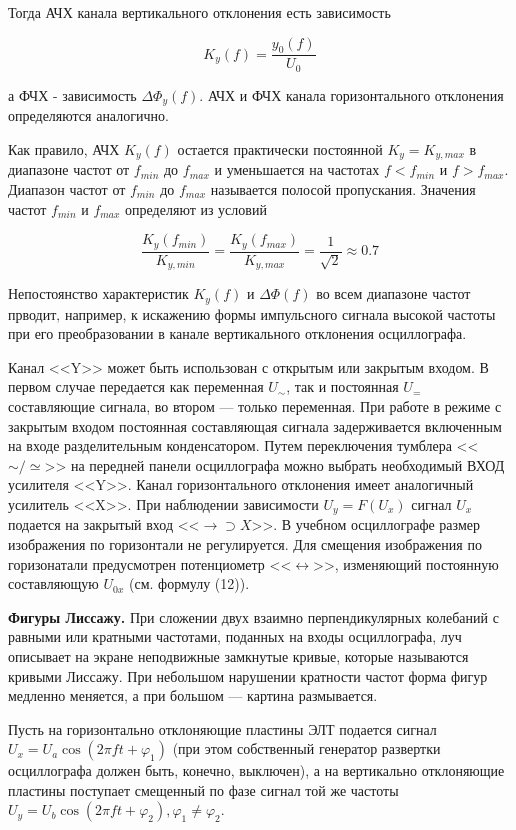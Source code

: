 \documentclass[14pt]{article}
\begin{document}
Тогда АЧХ канала вертикального отклонения есть зависимость

$$K_y(f) = \frac{y_0(f)}{U_0}$$

\noindent а ФЧХ - зависимость $\Delta \Phi_y(f)$. АЧХ и ФЧХ канала горизонтального отклонения определяются аналогично.

Как правило, АЧХ $K_y(f)$ остается практически постоянной $K_y = K_{y, max}$ в диапазоне частот от $f_{min}$ до $f_{max}$ и уменьшается на частотах  $f < f_{min}$ и $f > f_{max}$. Диапазон частот от $f_{min}$ до $f_{max}$ называется полосой пропускания. Значения частот $f_{min}$ и $f_{max}$ определяют из условий

$$\frac{K_y(f_{min})}{K_{y, min}} = \frac{K_y(f_{max})}{K_{y, max}} = \frac{1}{\sqrt{2}} \approx 0.7$$

Непостоянство характеристик $K_y(f)$ и $\Delta \Phi(f)$ во всем диапазоне частот прводит‚ например, к искажению формы импульсного сигнала высокой частоты при его преобразовании в канале вертикального отклонения осциллографа.

Канал <<Y>> может быть использован с открытым или закрытым входом. В первом случае передается как переменная $U_\sim$, так и постоянная $U_=$ составляющие сигнала, во втором — только переменная. При работе в режиме с закрытым входом постоянная составляющая сигнала задерживается включенным на входе разделительным конденсатором.
Путем переключения тумблера <<$\sim/\simeq$>> на передней панели осциллографа можно выбрать необходимый ВХОД усилителя <<Y>>. Канал горизонтального отклонения имеет аналогичный усилитель <<X>>.
При наблюдении зависимости  $U_y = F(U_x)$ сигнал $U_x$ подается на закрытый вход <<$\rightarrow \supset X$>>. В учебном осциллографе размер изображения по горизонтали не регулируется. Для смещения изображения по горизонатали предусмотрен потенциометр <<$\leftrightarrow$>>, изменяющий постоянную составляющую $U_{0x}$ (см. формулу (12)).

%
%

\vspace{0.5cm}
\textbf{Фигуры Лиссажу.} При сложении двух взаимно перпендикулярных колебаний с равными или кратными частотами, поданных на входы осциллографа, луч описывает на экране неподвижные замкнутые кривые, которые называются кривыми Лиссажу. При небольшом нарушении кратности частот форма фигур медленно меняется, а при большом --- картина размывается.

Пусть на горизонтально отклоняющие пластины ЭЛТ подается сигнал $U_x = U_a\cos (2\pi ft + \varphi_1)$ (при этом собственный генератор развертки осциллографа должен быть, конечно, выключен), а на вертикально отклоняющие пластины поступает смещенный по фазе сигнал той же частоты $U_y = U_b\cos (2\pi ft + \varphi_2), \varphi_1 \ne \varphi_2$.
\end{document}
